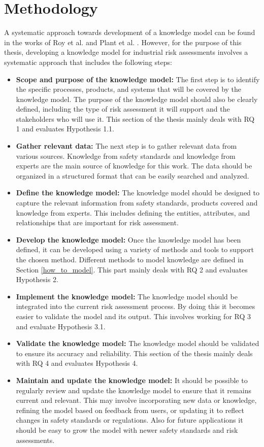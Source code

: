 \chapter{Methodology} \label{method}

\bigskip \bigskip A systematic approach towards development of a knowledge model can be found in the works of Roy et al. \cite{Roy2004} and Plant et al. \cite{Plant2003}. However, for the purpose of this thesis, developing a knowledge model for industrial risk assessments involves a systematic approach that includes the following steps:
\begin{itemize}
    \item \textbf{Scope and purpose of the knowledge model:} The first step is to identify the specific processes, products, and systems that will be covered by the knowledge model. The purpose of the knowledge model should also be clearly defined, including the type of risk assessment it will support and the stakeholders who will use it. This section of the thesis mainly deals with RQ 1 and evaluates Hypothesis 1.1.
    \item \textbf{Gather relevant data:} The next step is to gather relevant data from various sources. Knowledge from safety standards and knowledge from experts are the main source of knowledge for this work. The data should be organized in a structured format that can be easily searched and analyzed. 
    \item \textbf{Define the knowledge model:} The knowledge model should be designed to capture the relevant information from safety standards, products covered and knowledge from experts. This includes defining the entities, attributes, and relationships that are important for risk assessment.
    \item \textbf{Develop the knowledge model:} Once the knowledge model has been defined, it can be developed using a variety of methods and tools to support the chosen method. Different methods to model knowledge are defined in Section \ref{how_to_model}. This part mainly deals with RQ 2 and evaluates Hypothesis 2. 
    \item \textbf{Implement the knowledge model:} The knowledge model should be integrated into the current risk assessment process. By doing this it becomes easier to validate the model and its output. This involves working for RQ 3 and evaluate Hypothesis 3.1.
    \item \textbf{Validate the knowledge model:} The knowledge model should be validated to ensure its accuracy and reliability. This section of the thesis mainly deals with RQ 4 and evaluates Hypothesis 4.
    \item \textbf{Maintain and update the knowledge model:} It should be possible to regularly review and update the knowledge model to ensure that it remains current and relevant. This may involve incorporating new data or knowledge, refining the model based on feedback from users, or updating it to reflect changes in safety standards or regulations. Also for future applications it should be easy to grow the model with newer safety standards and risk assessments.
\end{itemize}

